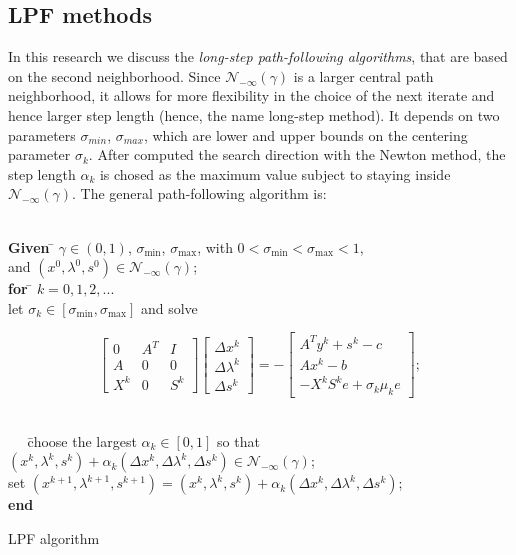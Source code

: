 \documentclass[a4paper,10 pt,titlepage,twoside]{book}
\theoremstyle{plain}
\theoremstyle{definition}
\theoremstyle{remark}
\begin{document}
\subsection*{LPF methods}
In this research we discuss the \textit{long-step path-following algorithms}, that are based on the second neighborhood. Since  $\mathcal{N}_{-\infty}(\gamma)$ is a larger central path neighborhood, it allows for more flexibility in the choice of the next iterate and hence larger  step length (hence, the name long-step method). It depends on two parameters $\sigma_{min}$, $\sigma_{max}$, which are lower and upper bounds on the centering parameter $\sigma_{k}$. After computed the search direction with the Newton method, the step length $\alpha_{k}$ is chosed as the maximum value subject to staying inside $\mathcal{N}_{-\infty}(\gamma)$.
The general path-following algorithm is:
\begin{algorithm}[H]
	\begin{tabbing}
		\\
		\textbf{Given  }\= $\gamma\in(0,1)$, $\sigma_{\text{min}}$, $\sigma_{\text{max}}$, with $0<\sigma_{\text{min}}< \sigma_{\text{max}}<1$,\\
		\> and $(x^{0}, \lambda^{0}, s^{0})\in\mathcal{N}_{-\infty}(\gamma)$;\\
		\textbf{for} \= $k = 0, 1, 2,...$ \\
		\> let $\sigma_{k}\in[\sigma_{\text{min}},\sigma_{\text{max}}]$ and solve
	\end{tabbing}
	\begin{equation}\label{Pb}
	\begin{bmatrix}
	0&A^{T}&I \\A&0&0\\X^{k}&0&S^{k}
	\end{bmatrix}\begin{bmatrix}
	\Delta x^{k}\\\Delta\lambda^{k} \\\Delta s^{k}
	\end{bmatrix}=-\begin{bmatrix}
	A^{T}y^{k}+s^{k}-c\\Ax^{k}-b\\-X^{k}S^{k}e + \sigma_{k}\mu_{k}e
	\end{bmatrix};
	\end{equation}
	\begin{tabbing}
		\\
		$\;\;\;\;\;$\=choose the largest $\alpha_{k}\in[0,1]$ so that $(x^{k}, \lambda^{k}, s^{k})+ \alpha_{k}(\Delta x^{k}, \Delta\lambda^{k}, \Delta s^{k})\in\mathcal{N}_{-\infty}(\gamma)$; \\
		\>set $(x^{k+1}, \lambda^{k+1}, s^{k+1}) = (x^{k}, \lambda^{k}, s^{k})+ \alpha_{k}(\Delta x^{k}, \Delta\lambda^{k}, \Delta s^{k})$;\\
		
		\textbf{end}
	\end{tabbing}
	\caption{LPF algorithm}
\end{algorithm}
\end{document}
